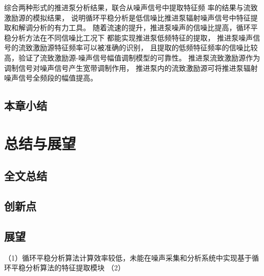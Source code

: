 综合两种形式的推进泵分析结果，联合从噪声信号中提取特征频
率的结果与流致激励源的模拟结果，
说明循环平稳分析是低信噪比推进泵辐射噪声信号中特征提取和解调分析的有力工具。
随着流速的提升，推进泵噪声的信噪比提高，循环平稳分析方法在不同信噪比工况下
都能实现推进泵低频特征的提取，
推进泵噪声信号的流致激励源特征频率可以被准确的识别，
且提取的低频特征频率的信噪比较高，验证了流致激励源-噪声信号幅值调制模型的可靠性。
推进泵流致激励源作为调制信号对噪声信号产生宽带调制作用，
推进泵内的流致激励源可将推进泵辐射噪声信号全频段的幅值提高。
\section{本章小结}

\chapter{总结与展望}
\section{全文总结}
\section{创新点}
\section{展望}
（1）循环平稳分析算法计算效率较低，未能在噪声采集和分析系统中实现基于循环平稳分析算法的特征提取模块
（2）